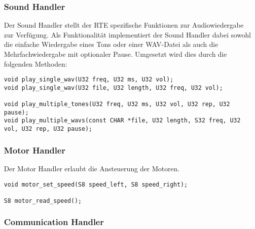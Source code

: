 


\subsubsection{Sound Handler}

Der Sound Handler stellt der RTE spezifische Funktionen zur Audiowiedergabe zur Verfügung.  
Als Funktionalität implementiert der Sound Handler dabei sowohl die einfache Wiedergabe eines Tons oder einer WAV-Datei als auch die Mehrfachwiedergabe mit optionaler Pause. Umgesetzt wird dies durch die folgenden Methoden:

\begin{lstlisting}[frame=single]  
void play_single_wav(U32 freq, U32 ms, U32 vol);
void play_single_wav(U32 file, U32 length, U32 freq, U32 vol);

void play_multiple_tones(U32 freq, U32 ms, U32 vol, U32 rep, U32 pause);
void play_multiple_wavs(const CHAR *file, U32 length, S32 freq, U32 vol, U32 rep, U32 pause);
\end{lstlisting}


\subsubsection{Motor Handler}

Der Motor Handler erlaubt die Ansteuerung der Motoren. 


\begin{lstlisting}[frame=single]  
void motor_set_speed(S8 speed_left, S8 speed_right);

S8 motor_read_speed();
\end{lstlisting}



\subsubsection{Communication Handler}

